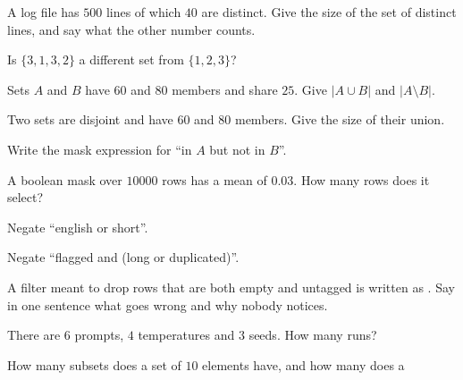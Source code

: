 \begin{testexercises}
\item A log file has $500$ lines of which $40$ are distinct. Give the size of
  the set of distinct lines, and say what the other number counts.
\item Is $\{3, 1, 3, 2\}$ a different set from $\{1, 2, 3\}$?
\item Sets $A$ and $B$ have $60$ and $80$ members and share $25$. Give
  $\lvert A \cup B \rvert$ and $\lvert A \setminus B \rvert$.
\item Two sets are disjoint and have $60$ and $80$ members. Give the size of
  their union.
\item Write the mask expression for \enquote{in $A$ but not in $B$}.
\item A boolean mask over $\num{10000}$ rows has a mean of $\num{0.03}$. How
  many rows does it select?
\item Negate \enquote{english or short}.
\item Negate \enquote{flagged and (long or duplicated)}.
\item A filter meant to drop rows that are both empty and untagged is written
  as . Say in one sentence what goes wrong and
  why nobody notices.
\item There are $6$ prompts, $4$ temperatures and $3$ seeds. How many runs?
\item How many subsets does a set of $10$ elements have, and how many does a

\end{testexercises}
